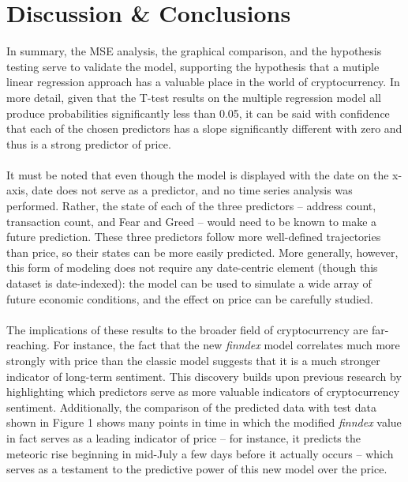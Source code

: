 \documentclass{article}
\begin{document}
\section{Discussion \& Conclusions}
In summary, the MSE analysis, the graphical comparison, and the hypothesis testing serve to validate the model, supporting the hypothesis that a mutiple linear regression approach has a valuable place in the world of cryptocurrency. In more detail, given that the T-test results on the multiple regression model all produce probabilities significantly less than 0.05, it can be said with confidence that each of the chosen predictors has a slope significantly different with zero and thus is a strong predictor of price. \\~\\
It must be noted that even though the model is displayed with the date on the x-axis, date does not serve as a predictor, and no time series analysis was performed. Rather, the state of each of the three predictors -- address count, transaction count, and Fear and Greed -- would need to be known to make a future prediction. These three predictors follow more well-defined trajectories than price, so their states can be more easily predicted. More generally, however, this form of modeling does not require any date-centric element (though this dataset is date-indexed): the model can be used to simulate a wide array of future economic conditions, and the effect on price can be carefully studied. \\~\\
The implications of these results to the broader field of cryptocurrency are far-reaching. For instance, the fact that the new \textit{finndex} model correlates much more strongly with price than the classic model suggests that it is a much stronger indicator of long-term sentiment. This discovery builds upon previous research by highlighting which predictors serve as more valuable indicators of cryptocurrency sentiment. Additionally, the comparison of the predicted data with test data shown in Figure 1 shows many points in time in which the modified \textit{finndex} value in fact serves as a leading indicator of price -- for instance, it predicts the meteoric rise beginning in mid-July a few days before it actually occurs -- which serves as a testament to the predictive power of this new model over the price. \\~\\
\end{document}
